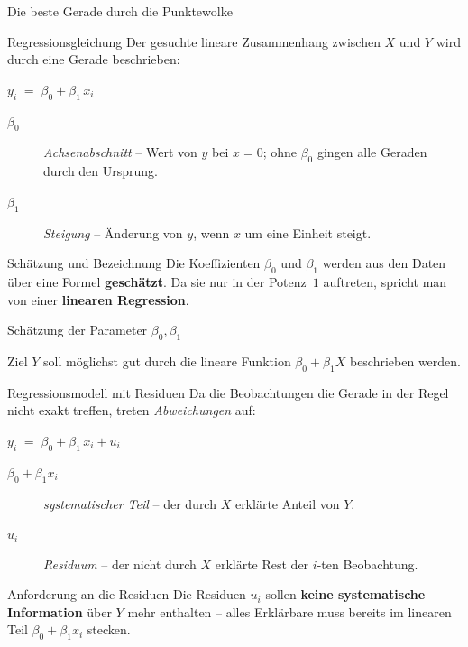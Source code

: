 \documentclass[aspectratio=169,11pt]{beamer}
\begin{document}
\begin{frame}{Die beste Gerade durch die Punktewolke}
  \begin{block}{Regressionsgleichung}
    Der gesuchte lineare Zusammenhang zwischen $X$ und $Y$ wird durch
    eine Gerade beschrieben:
    \begin{center}
      $y_i \;=\; \beta_0 + \beta_1 \, x_i$
    \end{center}
    \begin{description}
      \item[$\beta_0$] \emph{Achsenabschnitt} -- Wert von $y$ bei $x=0$;
            ohne $\beta_0$ gingen alle Geraden durch den Ursprung.
      \item[$\beta_1$] \emph{Steigung} -- Änderung von $y$, wenn $x$ um
            eine Einheit steigt.
    \end{description}
  \end{block}

  \begin{exampleblock}{Schätzung und Bezeichnung}
    Die Koeffizienten $\beta_0$ und $\beta_1$ werden aus den Daten
    über eine Formel \textbf{geschätzt}. Da sie nur in der Potenz~$1$
    auftreten, spricht man von einer \textbf{linearen Regression}.
  \end{exampleblock}
\end{frame}

\begin{frame}{Schätzung der Parameter $\beta_0,\beta_1$}
  \begin{block}{Ziel}
    $Y$ soll möglichst gut durch die lineare
    Funktion $\beta_0 + \beta_1 X$ beschrieben werden.
  \end{block}

  \begin{block}{Regressionsmodell mit Residuen}
    Da die Beobachtungen die Gerade in der Regel nicht exakt treffen,
    treten \emph{Abweichungen} auf:
    \begin{center}
      $y_i \;=\; \beta_0 + \beta_1 \, x_i + u_i$
    \end{center}
    \begin{description}
      \item[$\beta_0 + \beta_1 x_i$] \emph{systematischer Teil} --
            der durch $X$ erklärte Anteil von $Y$.
      \item[$u_i$] \emph{Residuum} -- der nicht durch $X$ erklärte
            Rest der $i$-ten Beobachtung.
    \end{description}
  \end{block}

  \begin{alertblock}{Anforderung an die Residuen}
    Die Residuen $u_i$ sollen \textbf{keine systematische Information}
    über $Y$ mehr enthalten -- alles Erklärbare muss bereits im
    linearen Teil $\beta_0 + \beta_1 x_i$ stecken.
  \end{alertblock}
\end{frame}
\end{document}
